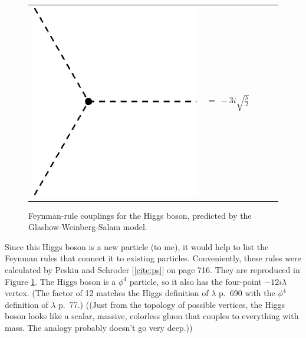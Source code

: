 \documentclass[12pt]{article}
\begin{document}
\begin{figure}[t]
\begin{center}
\begin{tabular}{c c p{0.5cm} c c}
\begin{minipage}{2cm}
        \includegraphics[width=\linewidth]{coupling_higgs-higgs.eps}
      \end{minipage} &
      \begin{minipage}{4cm}
        $=\ \displaystyle -3i\sqrt{\frac{\lambda}{2}}$
      \end{minipage} \\
    \end{tabular}
  \end{center}

  \caption{Feynman-rule couplings for the Higgs boson, predicted by
  the Glashow-Weinberg-Salam model.}

  \label{fig:couplings}
\end{figure}
      
Since this Higgs boson is a new particle (to me), it would help to
list the Feynman rules that connect it to existing particles.
Conveniently, these rules were calculated by Peskin and Schroder
[\ref{cite:ps}] on page 716. They are reproduced in Figure
\ref{fig:couplings}. The Higgs boson is a $\phi^4$ particle, so it
also has the four-point $-12i\lambda$ vertex. (The factor of 12
matches the Higgs definition of $\lambda$ p.~690 with the $\phi^4$
definition of $\lambda$ p.~77.) ((Just from the topology of possible
vertices, the Higgs boson looks like a scalar, massive, colorless
gluon that couples to everything with mass. The analogy probably
doesn't go very deep.))
\end{document}
